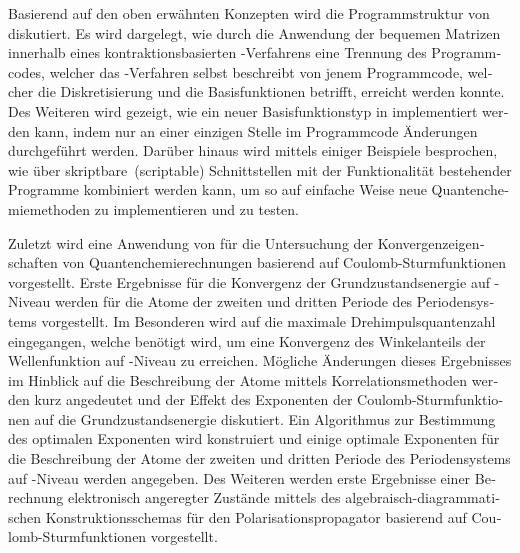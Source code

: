 \begin{otherlanguage}{ngerman}
Basierend auf den oben erwähnten Konzepten wird die Programmstruktur
von \molsturm diskutiert.
Es wird dargelegt, wie durch die Anwendung der bequemen Matrizen
innerhalb eines kontraktionsbasierten \SCF-Verfahrens
eine Trennung des Programmcodes,
welcher das \SCF-Verfahren selbst beschreibt
von jenem Programmcode, welcher die Diskretisierung und die Basisfunktionen betrifft,
erreicht werden konnte.
Des Weiteren wird gezeigt,
wie ein neuer Basisfunktionstyp in \molsturm implementiert werden kann,
indem nur an einer einzigen Stelle im Programmcode Änderungen durchgeführt werden.
Darüber hinaus wird mittels einiger Beispiele besprochen,
wie \molsturm über skriptbare~(scriptable) Schnittstellen
mit der Funktionalität bestehender Programme kombiniert werden kann,
um so auf einfache Weise neue Quantenchemiemethoden zu implementieren und zu testen.

Zuletzt wird eine Anwendung von \molsturm für
die Untersuchung der Konvergenzeigenschaften
von Quantenchemierechnungen basierend auf Coulomb-Sturmfunktionen vorgestellt.
Erste Ergebnisse für die Konvergenz der Grundzustandsenergie auf \HF-Niveau
werden für die Atome der zweiten und dritten Periode des Periodensystems vorgestellt.
Im Besonderen wird auf die maximale Drehimpulsquantenzahl eingegangen,
welche benötigt wird,
um eine Konvergenz des Winkelanteils der Wellenfunktion
auf \HF-Niveau zu erreichen.
Mögliche Änderungen dieses Ergebnisses im Hinblick auf die Beschreibung
der Atome mittels Korrelationsmethoden werden kurz angedeutet
und der Effekt des Exponenten der Coulomb-Sturmfunktionen
auf die Grundzustandsenergie diskutiert.
Ein Algorithmus zur Bestimmung des optimalen Exponenten wird konstruiert
und einige optimale Exponenten für die Beschreibung der Atome
der zweiten und dritten Periode des Periodensystems
auf \HF-Niveau werden angegeben.
Des Weiteren werden erste Ergebnisse einer Berechnung elektronisch
angeregter Zustände
mittels des algebraisch-diagrammatischen Konstruktionsschemas
für den Polarisationspropagator basierend auf Coulomb-Sturmfunktionen vorgestellt.
\end{otherlanguage}
